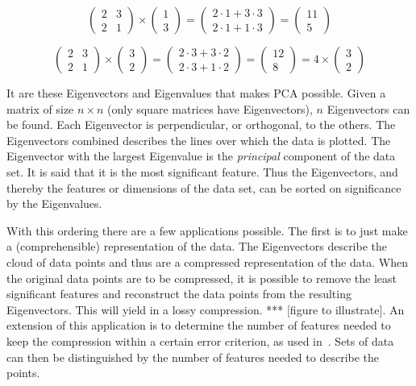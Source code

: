 \begin{equation}
	\label{eq:no-eigenvector}
	\begin{pmatrix} 2 & 3 \\ 2 & 1 \end{pmatrix}
	\times
	\begin{pmatrix} 1 \\ 3 \end{pmatrix}
	=
	\begin{pmatrix} 2 \cdot 1 + 3 \cdot 3 \\ 2 \cdot 1 + 1 \cdot 3
	\end{pmatrix}
	=
	\begin{pmatrix} 11 \\ 5 \end{pmatrix}
\end{equation}

\begin{equation}
	\label{eq:eigenvector}
	\begin{pmatrix} 2 & 3 \\ 2 & 1 \end{pmatrix}
	\times
	\begin{pmatrix} 3 \\ 2 \end{pmatrix}
	=
	\begin{pmatrix} 2 \cdot 3 + 3 \cdot 2 \\ 2 \cdot 3 + 1 \cdot 2
	\end{pmatrix}
	=
	\begin{pmatrix} 12 \\ 8 \end{pmatrix}
	=
	4 \times \begin{pmatrix} 3 \\ 2 \end{pmatrix}
\end{equation}

 It are these Eigenvectors and Eigenvalues that makes PCA possible.
 Given a matrix of size $n \times n$ (only square matrices have Eigenvectors), $n$ Eigenvectors can be found.
 Each Eigenvector is perpendicular, or orthogonal, to the others.
 The Eigenvectors combined describes the lines over which the data is plotted.
 The Eigenvector with the largest Eigenvalue is the \emph{principal} component of the data set.
 It is said that it is the most significant feature.
 Thus the Eigenvectors, and thereby the features or dimensions of the data set, can be sorted on significance by the Eigenvalues.

With this ordering there are a few applications possible.
The first is to just make a (comprehensible) representation of the data.
The Eigenvectors describe the cloud of data points and thus are a compressed representation of the data.
When the original data points are to be compressed, it is possible to remove the least significant features and reconstruct the data points from the resulting Eigenvectors.
This will yield in a lossy compression. *** [figure to illustrate].
An extension of this application is to determine the number of features needed to keep the compression within a certain error criterion, as used in~\cite{barbivc2004segmenting}.
Sets of data can then be distinguished by the number of features needed to describe the points.

